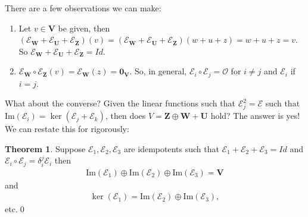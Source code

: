 \documentclass{book}
\theoremstyle{definition}
\newtheorem{thm}{Theorem}[section]
\newcommand{\V}{\mathbf{V}}
\newcommand{\W}{\mathbf{W}}
\newcommand{\Z}{\mathbf{Z}}
\newcommand{\U}{\mathbf{U}}
\newcommand{\E}{\mathcal{E}}
\newcommand{\ima}{\text{Im}}
\begin{document}
There are a few observations we can make:
\begin{enumerate}
	\item Let $v\in \V$ be given, then $(\E_\W + \E_\U + \E_\Z)(v) = (\E_\W + \E_\U + \E_\Z)(w + u + z) = w + u + z = v$. So $\E_\W + \E_\U + \E_\Z = Id$.
	
	\item $\E_\W\circ \E_\Z(v) = \E_\W(z) = \mathbf{0}_\V$. So, in general, $\E_i \circ \E_j = \mathcal{O}$ for $i \neq j$ and $\E_i$ if $i=j$.  
\end{enumerate}


What about the converse? Given the linear functions such that $\E_j^2 = \E$ such that $\ima(\E_i) = \ker(\E_j + \E_k)$, then does $V = \Z \oplus \W + \U$ hold? The answer is yes! We can restate this for rigorously:

\begin{thm}
	Suppose $\E_1, \E_2, \E_3$ are idempotents such that $\E_1 + \E_2 + \E_3 = Id$ and $\E_i \circ \E_j = \delta^j_i \E_i$ then 
	\begin{align*}
	\ima(\E_1) \oplus \ima(\E_2) \oplus \ima(\E_3) = \V
	\end{align*}
	and
	\begin{align*}
	\ker(\E_1) = \ima(\E_2) \oplus \ima(\E_3), 
	\end{align*}
	etc.\qed
\end{thm}
\end{document}

